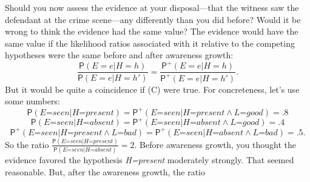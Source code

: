 \documentclass[
  11pt,
  dvipsnames,enabledeprecatedfontcommands]{scrartcl}
\newcommand{\pr}[1]{\ensuremath{\mathsf{P}(#1)}}
\newcommand{\ppr}[2]{\ensuremath{\mathsf{P}^{#1}(#2)}}
\begin{document}
Should you now assess the evidence at your disposal---that the witness
saw the defendant at the crime scene---any differently than you did
before? Would it be wrong to think the evidence had the same value? The
evidence would have the same value if the likelihood ratios associated
with it relative to the competing hypotheses were the same before and
after awareness growth:
\[\frac{\pr{E=e \vert H=h}}{\pr{E=e \vert H=h'}}= \frac{\ppr{+}{E=e \vert H=h}}{\ppr{+}{E=e \vert H=h'}} \tag{C}.\]
But it would be quite a coincidence if (C) were true. For concreteness,
let's use some numbers:
\[\pr{\textit{E=seen} \vert \textit{H=present}}=\ppr{+}{\textit{E=seen} \vert \textit{H=present} \wedge \textit{L=good}}=.8\]
\[\pr{\textit{E=seen} \vert \textit{H=absent}}=\ppr{+}{\textit{E=seen} \vert \textit{H=absent} \wedge \textit{L=good}}=.4\]
\[\ppr{+}{\textit{E=seen} \vert \textit{H=present} \wedge \textit{L=bad}} = \ppr{+}{\textit{E=seen} \vert \textit{H=absent} \wedge \textit{L=bad}}=.5.\]
So the ratio
\(\frac{\pr{\textit{E=seen} \vert \textit{H=present}}}{\pr{\textit{E=seen} \vert \textit{H=absent}}}=2\).
Before awareness growth, you thought the evidence favored the hypothesis
\textit{H=present} moderately strongly. That seemed reasonable. But,
after the awareness growth, the ratio
\end{document}
